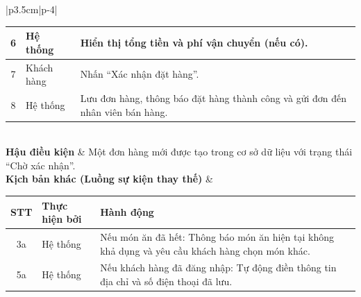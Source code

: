 \documentclass[../20232006p.tex]{subfiles}
\begin{document}
\begin{center}
\begin{longtable}{|p{3.5cm}|p{\dimexpr\textwidth-3.5cm-4\tabcolsep\relax}|}
\begin{tabular}{|c|p{2cm}|p{6.5cm}|}
            \hline
            6            & Hệ thống               & Hiển thị tổng tiền và phí vận chuyển (nếu có).                                 \\
            \hline
            7            & Khách hàng             & Nhấn ``Xác nhận đặt hàng''.                                                    \\
            \hline
            8            & Hệ thống               & Lưu đơn hàng, thông báo đặt hàng thành công và gửi đơn đến nhân viên bán hàng. \\
            \hline
        \end{tabular}
        \vspace{0.5em}                                                                                                                   \\
        \hline
        \textbf{Hậu điều kiện}                          & Một đơn hàng mới được tạo trong cơ sở dữ liệu với trạng thái ``Chờ xác nhận''. \\
        \hline
        \textbf{Kịch bản khác (Luồng sự kiện thay thế)} &
        \vspace{0.5em}
        \begin{tabular}{|c|p{2cm}|p{6.5cm}|}
            \hline
            \textbf{STT} & \textbf{Thực hiện bởi} & \textbf{Hành động}                                                                               \\
            \hline
            3a           & Hệ thống               & Nếu món ăn đã hết: Thông báo món ăn hiện tại không khả dụng và yêu cầu khách hàng chọn món khác. \\
            \hline
            5a           & Hệ thống               & Nếu khách hàng đã đăng nhập: Tự động điền thông tin địa chỉ và số điện thoại đã lưu.             \\
            \hline
        \end{tabular}
        \vspace{0.5em}                                                                                                                   \\
        \hline
        \caption{Đặc tả chức năng Đặt hàng trực tuyến}
        \label{tab:uc_online_order}
    \end{longtable}
\end{center}
\hfill
\end{document}
